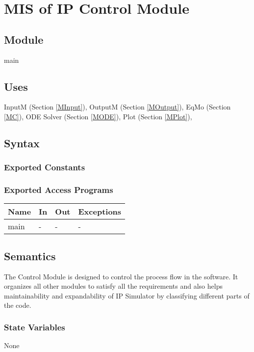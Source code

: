 \documentclass[12pt, titlepage]{article}
\begin{document}
\newpage
\section{MIS of IP Control Module \label{MControl} }

\subsection{Module}
main


\subsection{Uses}
InputM (Section \ref{MInput}),
OutputM (Section \ref{MOutput}),
EqMo (Section \ref{MC}),
ODE Solver (Section \ref{MODE}),
Plot (Section \ref{MPlot}),

\subsection{Syntax}

\subsubsection{Exported Constants}

\subsubsection{Exported Access Programs}

\begin{center}
\begin{tabular}{p{2cm} p{4cm} p{4cm} p{2cm}}
\hline
\textbf{Name} & \textbf{In} & \textbf{Out} & \textbf{Exceptions} \\
\hline
main & - & - & - \\

\end{tabular}
\end{center}

\subsection{Semantics}
The Control Module is designed to control the process flow in the software. It organizes all other modules to satisfy all the requirements and also helps maintainability and expandability of IP Simulator by classifying different parts of the code.
\subsubsection{State Variables}
None
\end{document}
